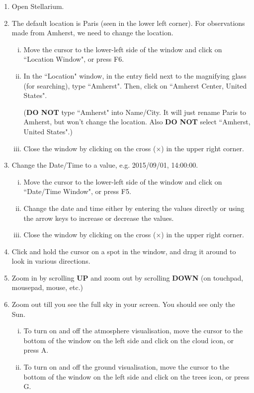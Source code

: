 \documentclass[main.tex]{subfiles}
\begin{document}
\begin{enumerate}
\item
Open Stellarium.
\item
The default location is Paris (seen in the lower left corner). For observations made from Amherst, we need to change the location.
\begin{enumerate}[i.]
    \item
    Move the cursor to the lower-left side of the window and click on ``Location Window", or press F6.
    \item
    In the ``Location" window, in the entry field next to the magnifying glass (for searching), type ``Amherst". Then, click on ``Amherst Center, United States".
    
    (\textbf{DO NOT} type ``Amherst" into Name/City. It will just rename Paris to Amherst, but won't change the location. Also \textbf{DO NOT} select ``Amherst, United States".)
    \item
    Close the window by clicking on the cross ($\times$) in the upper right corner.
\end{enumerate}
\item
Change the Date/Time to a value, e.g. 2015/09/01, 14:00:00.
\begin{enumerate}[i.]
    \item
    Move the cursor to the lower-left side of the window and click on ``Date/Time Window", or press F5.
    \item
    Change the date and time either by entering the values directly or using the arrow keys to increase or decrease the values.
    \item
    Close the window by clicking on the cross ($\times$) in the upper right corner.
\end{enumerate}
\item
Click and hold the cursor on a spot in the window, and drag it around to look in various directions.
\item
Zoom in by scrolling \textbf{UP} and zoom out by scrolling \textbf{DOWN} (on touchpad, mousepad, mouse, etc.)
\item
Zoom out till you see the full sky in your screen. You should see only the Sun.
\begin{enumerate}[i.]
    \item
    To turn on and off the atmosphere visualisation, move the cursor to the bottom of the window on the left side and click on the cloud icon, or press A.
    \item
    To turn on and off the ground visualisation, move the cursor to the bottom of the window on the left side and click on the trees icon, or press G.

\end{enumerate}
\end{enumerate}
\end{document}
